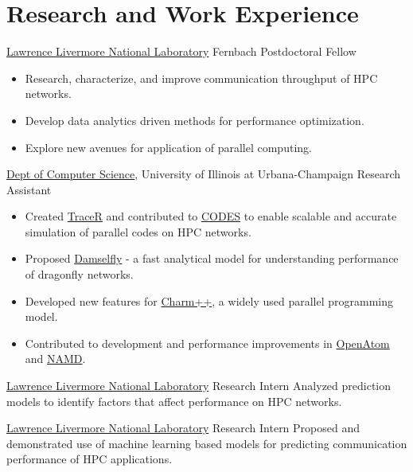 \section{Research and Work Experience}
		{\href{http://www.llnl.gov}{Lawrence Livermore National Laboratory}}
		{Fernbach Postdoctoral Fellow}
		{}{}
		{
		\begin{itemize}
		\item Research, characterize, and improve communication throughput of HPC networks.
    \item Develop data analytics driven methods for performance optimization.
    \item Explore new avenues for application of parallel computing.
		\end{itemize}
	  }
		{\href{https://cs.illinois.edu}{Dept of Computer Science}, University of Illinois at Urbana-Champaign}
		{Research Assistant}
		{}{}
		{
		\begin{itemize}
    \item Created \href{https://github.com/LLNL/tracer}{TraceR} and contributed
    to \href{https://xgitlab.cels.anl.gov/codes/codes}{CODES} to enable scalable and accurate simulation of parallel codes on HPC networks.
    \item Proposed \href{https://github.com/LLNL/damselfly}{Damselfly} - a fast
    analytical model for understanding performance of dragonfly networks.
    \item Developed new features for
    \href{https://charm.cs.illinois.edu}{Charm++}, a widely used parallel programming model.
    \item Contributed to development and performance improvements in
    \href{http://charm.cs.illinois.edu/OpenAtom/}{OpenAtom} and \href{http://www.ks.uiuc.edu/Research/namd}{NAMD}.
		\end{itemize}
    }

		{\href{http://www.llnl.gov}{Lawrence Livermore National Laboratory}}
		{Research Intern}
		{}{}
		{Analyzed prediction models to identify factors that affect performance on HPC networks.}

		{\href{http://www.llnl.gov}{Lawrence Livermore National Laboratory}}
		{Research Intern}
		{}{}
		{Proposed and demonstrated use of machine learning based models for predicting communication
    performance of HPC applications.}

